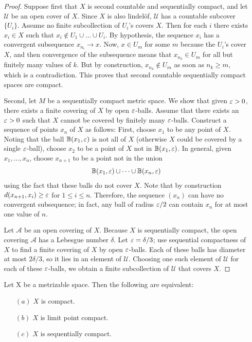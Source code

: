 \begin{proof}
Suppose first that $X$ is second countable and sequentially compact, and let $\mathcal{U}$ be an open cover of $X$. Since $X$ is also lindel\"of, $\mathcal{U}$ has a countable subcover $\{U_i\}$. Assume no finite subcollection of $U_i$'s covers $X$. Then for each $i$ there exists $x_i\in X$ such that $x_i\notin U_1\cup\dots\cup U_i$. By hypothesis, the sequence $x_i$ has a convergent subsequence $x_{n_i}\to x$. Now, $x\in U_m$ for some $m$ because the $U_i$'s cover $X$, and then convergence of the subsequence means that $x_{n_k}\in U_m$ for all but finitely many values of $k$. But by construction, $x_{n_k}\notin U_m$ as soon as $n_k\geq m$, which is a contradiction. This proves that second countable sequentially compact spaces are compact.\par
Second, let $M$ be a sequentially compact metric space. We show that given $\varepsilon>0$, there exists a finite covering of $X$ by open $\varepsilon$-balls. Assume that there exists an $\varepsilon>0$ such that $X$ cannot be covered by finitely many $\varepsilon$-balls. Construct a sequence of points $x_n$ of $X$ as follows: First, choose $x_1$ to be any point of $X$. Noting that the ball $\mathbb{B}(x_1,\varepsilon)$ is not all of $X$ (otherwise $X$ could be covered by a single $\varepsilon$-ball), choose $x_2$ to be a point of $X$ not in $\mathbb{B}(x_1,\varepsilon)$. In general, given $x_1,\dots,x_n$, choose $x_{n+1}$ to be a point not in the union 
\[\mathbb{B}(x_1,\varepsilon)\cup\cdots\cup\mathbb{B}(x_n,\varepsilon)\]
using the fact that these balls do not cover $X$. Note that by construction $d(x_{n+1},x_i)\geq\varepsilon$ for $1\leq i\leq n$. Therefore, the sequence $(x_n)$ can have no convergent subsequence; in fact, any ball of radius $\varepsilon/2$ can contain $x_n$ for at most one value of $n$.\par
Let $\mathcal{A}$ be an open covering of $X$. Because $X$ is sequentially compact, the open covering $\mathcal{A}$ has a Lebesgue number $\delta$. Let $\varepsilon=\delta/3$; use sequential compactness of $X$ to find a finite covering of $X$ by open $\varepsilon$-balls. Each of these balls has diameter at most $2\delta/3$, so it lies in an element of $\mathcal{U}$. Choosing one such element of $\mathcal{U}$ for each of these $\varepsilon$-balls, we obtain a finite subcollection of $\mathcal{U}$ that covers $X$.
\end{proof}
\begin{theorem}
Let X be a metrizable space. Then the following are equivalent:
\begin{itemize}
\item[$(a)$]$X$ is compact.
\item[$(b)$]$X$ is limit point compact.
\item[$(c)$]$X$ is sequentially compact.
\end{itemize}
\end{theorem}
